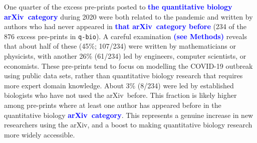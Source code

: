 \documentclass[]{rsos}%
\newcommand{\arxiv}{arXiv}
\newcommand{\change}[1]{\textcolor{blue}{\textbf{#1}}}
\begin{document}
One quarter of the excess pre-prints posted to \change{the quantitative biology \arxiv\ category} during 2020 were both related to the pandemic and written by authors who had never appeared in \change{that \arxiv\ category before} (234 of the 876 excess pre-prints in \texttt{q-bio}). A careful examination \change{(see Methods)} reveals that about half of these (45\%; 107/234) were written by mathematicians or physicists, with another 26\% (61/234) led by engineers, computer scientists, or economists. These pre-prints tend to focus on modelling the COVID-19 outbreak using public data sets, rather than quantitative biology research that requires more expert domain knowledge. About 3\% (8/234) were led by established biologists who have not used the \arxiv\ before. This fraction is likely higher among pre-prints where at least one author has appeared before in the quantitative biology \change{\arxiv\ category}. This represents a genuine increase in new researchers using the \arxiv, and a boost to making quantitative biology research more widely accessible. 











\end{document}
